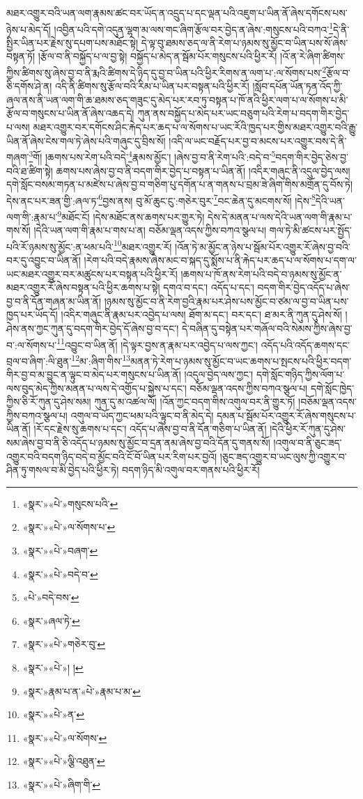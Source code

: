 མཐར་འགྱུར་བའི་ཡན་ལག་རྣམས་ཚང་བར་ཡོད་ན་འདྲུད་པ་དང་ལྡན་པའི་འཇུག་པ་ཡིན་ནོ་ཞེས་དགོངས་པས་ཉེས་པ་མེད་དོ། །འབྱིན་པའི་དགེ་འདུན་ལྷག་མ་ལས་གང་ཞིག་རྩོལ་བར་བྱེད་ན་ཞེས་:གསུངས་པའི་བཀའ་\footnote{«སྣར་»«པེ་»གསུངས་པའི་}དེ་ནི་སྤྱིར་ཡིན་པར་རྗེས་སུ་དཔག་པས་མཐོང་སྟེ། དེ་ལྟ་བུ་ཐམས་ཅད་ལ་ནི་རེག་པ་ཉམས་སུ་མྱོང་བ་ཡིན་པས་སོ་ཞེས་བསྟན་ཏོ། །རྩོལ་བ་ནི་བསྐྱོད་པ་ལ་བྱ་སྟེ། བསྐྱོད་པ་མེད་ན་སྦོམ་པོར་གསུངས་པའི་ཕྱིར་རོ། །འོ་ན་རེ་ཞིག་ཚིགས་ཀྱིས་ཚིགས་སུ་ཞེས་བྱ་བ་ནི་རྨའི་ཚིགས་དེ་ཉིད་དུ་བྱ་བ་ཡིན་པའི་ཕྱིར་རིགས་ན་ལག་པ་:ལ་སོགས་པས་\footnote{«སྣར་»«པེ་»ལ་སོགས་པ་}རྩོལ་བ་ཅི་དགོས་ཤེ་ན། འདི་ནི་ཚིགས་སུ་རྩོལ་བའི་རིམ་པ་ཡིན་པར་བསྟན་པའི་ཕྱིར་རོ། །སློབ་དཔོན་ཡོན་ཏན་འོད་ཀྱི་ཞལ་ནས་ནི་ཡན་ལག་གི་ཆ་ཐམས་ཅད་གཟུང་དུ་མེད་པར་རབ་ཏུ་བསྟན་པ་ཁོ་ནའི་ཕྱིར་ལག་པ་ལ་སོགས་པ་མི་རྩོལ་བ་གསུངས་པ་ཡིན་ནོ་ཞེས་འཆད་དེ། ཀུན་ནས་བསྐྱོད་པ་མེད་པར་ཡང་བཅུག་པའི་རེག་པ་བདག་གིར་བྱེད་པ་ལས། མཐར་འགྱུར་བར་དགོངས་ཤིང་རྐེད་པར་ཆད་པ་ལ་སོགས་པ་ཡང་རོའི་ཁྱད་པར་གྱིས་མཐར་འགྱུར་བའི་རྒྱུ་ཡིན་ནོ་ཞེས་ངེས་གལ་ཏེ་ཞེས་པའི་གཞུང་དུ་བྲིས་སོ། །འདི་ལ་ཡང་བརྗོད་པར་བྱ་བ་མངས་པར་འགྱུར་བས་དེ་ནི་གཞག་\footnote{«སྣར་»«པེ་»བཞག་}གོ། །ཆགས་པས་རེག་པའི་བདེ་\footnote{«སྣར་»«པེ་»བདེ་བ་}རྣམས་མྱོང་། །ཞེས་བྱ་བ་ནི་རེག་པའི་:བདེ་བ་\footnote{«པེ་»བདེ་བས་}བདག་གིར་བྱེད་ཅེས་བྱ་བའི་ཐ་ཚིག་སྟེ། ཆགས་པས་ཞེས་བྱ་བ་ནི་བདག་གིར་བྱེད་པ་བསྟན་པ་ཡིན་ནོ། །འདིར་གཞུང་ནི་འདུལ་བྱེད་ལས། དགེ་སློང་བསམ་གཏན་པ་མཛེས་པ་ཞེས་བྱ་བ་གཅིག་པུ་དགོན་པ་ན་གནས་པ་བྲམ་ཟེ་ཞིག་གིས་མགྲོན་དུ་བོས་ཏེ། དེས་ནང་པར་ཟན་གྱི་:ཞལ་ཏ་\footnote{«སྣར་»ཞལ་ཏེ་}བྱས་ནས། བུ་མོ་ཆུང་ངུ་:གཅེར་བུར་\footnote{«སྣར་»«པེ་»གཅེར་བུ་}བང་ཆེན་དུ་མངགས་སོ། །དེས་\footnote{«སྣར་»«པེ་»། །}དེའི་ཡན་ལག་གི་:རྣམ་པ་\footnote{«སྣར་»རྣམ་པ་ན་«པེ་»རྣམ་པ་མ་}མཐོང་ངོ། །དེས་མཐོང་ནས་ཆགས་པར་གྱུར་ཏེ། དེས་དེ་མནན་པ་ལས་དེའི་ཡན་ལག་གི་རྣམ་པ་གས་སོ། །དེའི་ཡན་ལག་གི་རྣམ་པ་གས་པ་ན། བཅོམ་ལྡན་འདས་ཀྱིས་བཀའ་སྩལ་པ། གལ་ཏེ་མི་ཚངས་པར་སྤྱོད་པའི་རོ་ཉམས་སུ་མྱོང་:ན་ཕམ་པའི་\footnote{«སྣར་»«པེ་»ན་}མཐར་འགྱུར་རོ། །འོན་ཏེ་མ་མྱོང་ན་ཉེས་པ་སྦོམ་པོར་འགྱུར་རོ་ཞེས་བྱ་བའི་བར་དུ་འབྱུང་བ་ཡིན་ནོ། །རེག་པའི་བདེ་རྣམས་ཞེས་མང་བ་སྐད་དུ་སྨོས་པ་ནི་རྐེད་པར་ཆད་པ་ལ་སོགས་པ་དག་ལ་ཡང་མཐར་འགྱུར་བར་མཚུངས་པར་བསྟན་པའི་ཕྱིར་རོ། །ཆགས་པ་ཁོ་ནས་རེག་པའི་བདེ་བ་ཉམས་སུ་མྱོང་ན་མཐར་འགྱུར་རོ་ཞེས་བསྟན་པའི་ཕྱིར་ཆགས་པ་སྟེ། དགའ་བ་དང་། འདོད་པ་དང་། བདག་གིར་བྱེད་འདོད་པ་ཞེས་བྱ་བ་ནི་དོན་གཞན་མ་ཡིན་ནོ། །ཉམས་སུ་མྱོང་བ་ནི་རེག་བྱའི་རྣམ་པར་ཤེས་པས་མྱོང་བ་ཙམ་ལ་བྱ་བ་ཡིན་པས་ཁྱད་པར་ཡོད་དོ། །འདིར་གཞུང་ནི་རྣམ་པར་འབྱེད་པ་ལས། ཐོག་མ་དང་། བར་དང་། ཐ་མར་ནི་ཀུན་དུ་ཤེས་སོ། །ཤེས་ནས་ཀྱང་ཀུན་དུ་བདག་གིར་བྱེད་དོ་ཞེས་བྱ་བ་དང་། དེ་བཞིན་དུ་བསྟེན་པར་གཞོལ་བའི་སེམས་ཀྱིས་ཞེས་བྱ་བ་:ལ་སོགས་པ་\footnote{«སྣར་»«པེ་»ལ་སོགས་}འབྱུང་བ་ཡིན་ནོ། །དེ་ལྟར་བྱས་ན་རྣམ་པར་འབྱེད་པ་ལས་ཀྱང་། འདོད་པའི་འདོད་ཆགས་དང་བྲལ་བ་ཞིག་:ལི་ཐུན་\footnote{«སྣར་»«པེ་»ལྕི་འཐུན་}མ་:ཞིག་གིས་\footnote{«སྣར་»«པེ་»ཞིག་གི་}མནན་ཏེ་རེག་པ་ཉམས་སུ་མྱོང་བ་ཡང་ཆགས་པ་སྤངས་པའི་ཕྱིར་བདག་གིར་བྱ་བ་མ་བྱུང་ན་ལྟུང་བ་མེད་པར་གསུངས་པ་ཡིན་ནོ། །འདུལ་བྱེད་ལས་ཀྱང་། དགེ་སློང་གཉིད་ཀྱིས་ལོག་པ་ལས་བུད་མེད་ཀྱིས་མནན་པ་ལས་དེ་འགྱོད་པ་སྐྱེས་པ་དང་། བཅོམ་ལྡན་འདས་ཀྱིས་བཀའ་སྩལ་པ། དགེ་སློང་ཁྱེད་ཀྱིས་ཅི་རོ་ཀུན་དུ་ཤེས་སམ། ཀུན་དུ་མ་འཚལ་ལོ། །འོན་ཀྱང་བདག་གིས་འགུལ་བར་ནི་གྱུར་ཏོ། །བཅོམ་ལྡན་འདས་ཀྱིས་བཀའ་སྩལ་པ། འགུལ་བ་ཡོད་ཀྱང་ཕམ་པའི་ལྟུང་བ་ནི་མེད་དེ། དམན་པ་སྦོམ་པོར་འགྱུར་རོ་ཞེས་གསུངས་པ་ཡིན་ནོ། །རོ་དང་རྗེས་སུ་ཆགས་པ་དང་། འདོད་པ་ཞེས་བྱ་བ་ནི་དོན་གཅིག་པ་ཡིན་ནོ། །དེའི་ཕྱིར་རོ་ཀུན་དུ་ཤེས་སམ་ཞེས་བྱ་བ་ནི་ཅི་འདོད་པ་ཉམས་སུ་མྱོང་བ་དྲན་ནམ་ཞེས་བྱ་བའི་དོན་དུ་གནས་སོ། །འགུལ་བ་ནི་ཅུང་ཟད་འགྱུར་བའི་བདག་ཉིད་བདེ་བ་མྱོང་བའི་ངོ་བོ་ཡིན་པར་རིག་པར་བྱའོ། །ཅུང་ཟད་འགྱུར་བ་ཡང་ལུས་ཀྱི་འགྱུར་བ་ཤིན་ཏུ་གསལ་བ་མི་བྱེད་པའི་ཕྱིར་ཏེ། བདག་ཉིད་མི་འགུལ་བར་གནས་པའི་ཕྱིར་རོ། 